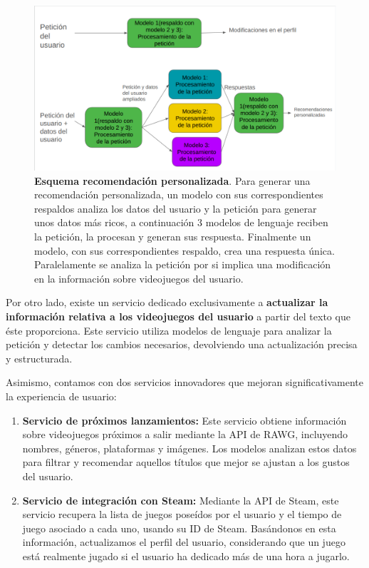 \begin{figure}[H]
	\centering
	\includegraphics[width=1\linewidth]{imagenes/esquemaRecomendacionPersonalizada.png}
	\caption[\textbf{Esquema recomendación personalizada}.]{\textbf{Esquema recomendación personalizada}. Para generar una recomendación personalizada, un modelo con sus correspondientes respaldos analiza los datos del usuario y la petición para generar unos datos más ricos, a continuación 3 modelos de lenguaje reciben la petición, la procesan y generan sus respuesta. Finalmente un modelo, con sus correspondientes respaldo, crea una respuesta única. Paralelamente se analiza la petición por si implica una modificación en la información sobre videojuegos del usuario.}
	\label{esquemaRB}
\end{figure}

Por otro lado, existe un servicio dedicado exclusivamente a \textbf{actualizar la información relativa a los videojuegos del usuario} a partir del texto que éste proporciona. Este servicio utiliza modelos de lenguaje para analizar la petición y detectar los cambios necesarios, devolviendo una actualización precisa y estructurada.

Asimismo, contamos con dos servicios innovadores que mejoran significativamente la experiencia de usuario:

\begin{enumerate}
	\item \textbf{Servicio de próximos lanzamientos:} Este servicio obtiene información sobre videojuegos próximos a salir mediante la API de RAWG, incluyendo nombres, géneros, plataformas y imágenes. Los modelos analizan estos datos para filtrar y recomendar aquellos títulos que mejor se ajustan a los gustos del usuario.
	\item \textbf{Servicio de integración con Steam:} Mediante la API de Steam, este servicio recupera la lista de juegos poseídos por el usuario y el tiempo de juego asociado a cada uno, usando su ID de Steam. Basándonos en esta información, actualizamos el perfil del usuario, considerando que un juego está realmente jugado si el usuario ha dedicado más de una hora a jugarlo.
\end{enumerate}

